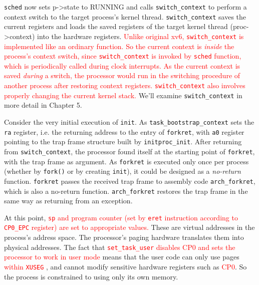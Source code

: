 \documentclass{report}
\def \hilite#1{\textcolor{red}{#1}}
\newenvironment{hilight}{\color{red}}{\color{black}}
\begin{document}
	\texttt{sched} now sets p->state to RUNNING and calls \texttt{switch\_context} to perform a
	context switch to the target process's kernel thread. \texttt{switch\_context} saves the current registers
	and loads the saved registers of the target kernel thread (proc->context) into the
	hardware registers. \hilite{
		Unlike original xv6, \texttt{switch\_context} is implemented like an ordinary function.
		So the current context is \emph{inside} the process's context switch,
		since \texttt{switch\_context} is invoked by \texttt{sched} function, which is periodically called
		during clock interrupts.  As the current context is saved \emph{during} a switch, the processor
		would run in the switching procedure of another process after restoring context registers.
		\texttt{switch\_context} also involves properly changing the current kernel stack.
	} We'll examine \texttt{switch\_context} in more detail in Chapter 5.
	
	\begin{hilight}
		Consider the very initial execution of \texttt{init}. As \texttt{task\_bootstrap\_context}
		 sets the \texttt{ra} register, i.e. the returning address to the entry of \texttt{forkret},
		with \texttt{a0} register pointing to the trap frame structure built by \texttt{initproc\_init}.
		After returning from \texttt{switch\_context}, the processor found itself at the starting point
		of \texttt{forkret},
		with the trap frame as argument.  As \texttt{forkret} is executed only once
		per process (whether by \texttt{fork()} or by creating \texttt{init}), it could be designed as a
		\emph{no-return} function.  \texttt{forkret} passes the received trap frame to assembly code
		\texttt{arch\_forkret}, which is also a no-return function.  \texttt{arch\_forkret}
		 restores the trap frame in the same way as returning from an exception.
	\end{hilight}
	
	At this point, \hilite{
		\texttt{sp} and program counter (set by \texttt{eret} instruction
		according to \texttt{CP0\_EPC} register) are set to appropriate values.
	} These are virtual addresses
	in the process's address space. The processor's paging hardware translates them into
	physical addresses. The fact that \hilite{
		\texttt{set\_task\_user}
		\marginpar{
			\footnotesize\ttfamily
			arch/mips/sched/\\task.c:53
		} disables CP0 and sets the processor to work in user mode
	}
	means that the user code can only use pages \hilite{
		within \texttt{XUSEG}
		\marginpar{
			\footnotesize\ttfamily
			\hilite{
				arch/mips/include\\
				asm/addrspace.h:44
			}
		}
	},
	and cannot modify sensitive hardware registers such as \hilite{CP0}.
	So the process is constrained to using only its own memory.
	
\end{document}
